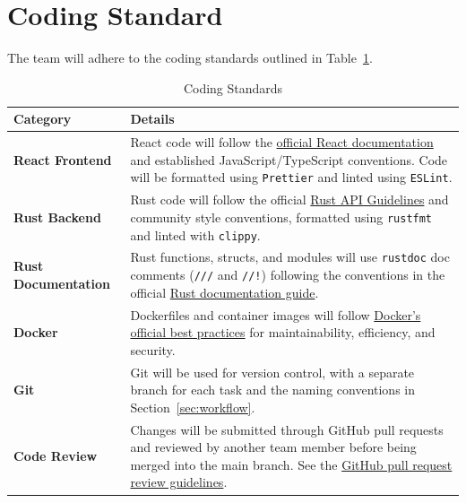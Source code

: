\documentclass{article}
\begin{document}
\section{Coding Standard}

The team will adhere to the coding standards outlined in Table~\ref{tab:coding-standards}.

\begin{table}[ht]
    \centering
    
    \begin{tabularx}{\textwidth}{|>{\centering\arraybackslash}p{3cm}|X|}
        \hline
        \textbf{Category} & \textbf{Details} \\
        \hline
        
        \textbf{React Frontend} &
        React code will follow the
        \href{https://react.dev/learn}{official React documentation}
        and established JavaScript/TypeScript conventions. Code will be
        formatted using \texttt{Prettier} and linted using \texttt{ESLint}. \\
        \hline

        
        \textbf{Rust Backend} &
        Rust code will follow the official
        \href{https://rust-lang.github.io/api-guidelines/}{Rust API Guidelines}
        and community style conventions, formatted using \texttt{rustfmt}
        and linted with \texttt{clippy}. \\
        \hline
        
        \textbf{Rust Documentation} &
        Rust functions, structs, and modules will use
        \texttt{rustdoc} doc comments (\texttt{///} and \texttt{//!})
        following the conventions in the official
        \href{https://doc.rust-lang.org/rustdoc/how-to-write-documentation.html}
        {Rust documentation guide}. \\
        \hline
        
        \textbf{Docker} &
        Dockerfiles and container images will follow
        \href{https://github.com/microsoft/docker/blob/master/docs/userguide/eng-image/dockerfile_best-practices.md}
        {Docker's official best practices}
        for maintainability, efficiency, and security. \\
        \hline
        
        \textbf{Git} &
        Git will be used for version control, with a separate branch
        for each task and the naming conventions in
        Section~\ref{sec:workflow}. \\
        \hline
        
        \textbf{Code Review} &
        Changes will be submitted through GitHub pull requests and
        reviewed by another team member before being merged into the
        main branch. See the
        \href{https://docs.github.com/en/pull-requests/concepts/giving-reviews}
        {GitHub pull request review guidelines}. \\
        \hline
        
    \end{tabularx}
    
    \caption{Coding Standards}
    \label{tab:coding-standards}
    
\end{table}
\end{document}
